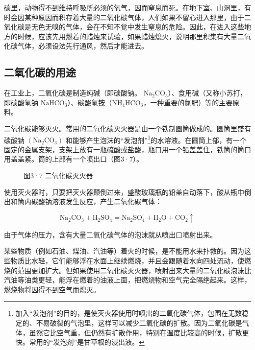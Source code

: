 碳里，动物得不到维持呼吸所必须的氧气，因而窒息而死。在地下室、山洞里，有时会因某种原因而积存着大量的二氧化碳气体，人们如果不留心进入那里，由于二氧化碳是无色无嗅的气体，会在不知不觉中发生窒息的危险。因此，在进入这些地方的时候，应该先用燃着的蜡烛来试验，如果蜡烛熄火，说明那里积集有大量二氧化碳气体，必须设法先行通风，然后才能进去。

\subsection{二氧化碳的用途}

在工业上，二氧化碳是制造纯碱（即碳酸钠。
\(\mathrm{Na}_{2}\mathrm{CO}_{3}\)）、食用碱（又称小苏打，即碳酸氢钠
\(\mathrm{NaHCO}_{3}\)）、碳酸氢铵（\(\mathrm{NH}_{4}\mathrm{HCO}_{3}\)，一种重要的氮肥）等的主要原料。

二氧化碳能够灭火。常用的二氧化碳灭火器是由一个铁制圆筒做成的。圆筒里盛有碳酸钠
\(\left(\mathrm{Na}_{2}\mathrm{CO}_{3}\right)\)
和能够产生泡沫的``发泡剂''\footnote{加入``发泡剂''的目的，是使灭火器使用时喷出的二氧化碳气体，包围在无数稳定的、不易破裂的气泡里，这样可以减少二氧化碳的扩散。因为二氧化碳是气体，虽然它比空气重，但仍然有扩散作用，特别在温度比较高的时候，扩散更快。常用的``发泡剂''是甘草根的浸出液。}的水溶液。在圆筒上部，有一个固定的金属支架，支架上放有一瓶硫酸或盐酸，瓶口用一个铅盖盖住，铁筒的筒口用盖盖紧。筒的上部有一个喷出口（图3·7）。

\begin{figure}
\centering
\caption{图3·7 二氧化碳灭火器}
\end{figure}

使用灭火器时，只要把灭火器颠倒过来，盛酸玻璃瓶的铅盖自动落下，酸从瓶中倒出和筒内碳酸钠溶液发生反应，产生二氧化碳气体：

\[
\mathrm{Na}_{2} \mathrm{CO}_{3} + \mathrm{H}_{2} \mathrm{SO}_{4} = \mathrm{Na}_{2} \mathrm{SO}_{4} + \mathrm{H}_{2} \mathrm{O} + \mathrm{CO}_{2} \uparrow
\]

由于气体的压力，含有大量二氧化碳气体的泡沫就从喷出口喷射出来。

某些物质（例如石油、煤油、汽油等）着火的时候，是不能用水来扑救的。因为这些物质比水轻，它们能够浮在水面上继续燃烧，并且会跟随着水向四处流动，使燃烧的范围更加扩大。但如果使用二氧化碳灭火器，喷射出来大量的二氧化碳泡沫比汽油等油类更轻，能浮在燃着的油液上面，把燃烧物和空气完全隔绝起来。这样，燃烧物将因得不到空气而熄灭。

